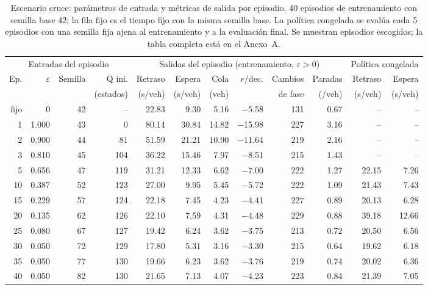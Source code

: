 \begin{table}[H]
\centering
\scriptsize
\setlength{\tabcolsep}{3pt}
\begin{tabular}{rrrrrrrrrrrr}
\toprule
\multicolumn{4}{c}{Entradas del episodio} & \multicolumn{6}{c}{Salidas del episodio (entrenamiento, $\varepsilon>0$)} & \multicolumn{2}{c}{Política congelada} \\
\cmidrule(lr){1-4}\cmidrule(lr){5-10}\cmidrule(lr){11-12}
Ep. & $\varepsilon$ & Semilla & Q ini. & Retraso & Espera & Cola & $r$/dec. & Cambios & Paradas & Retraso & Espera \\
 &  &  & (estados) & (s/veh) & (s/veh) & (veh) &  & de fase & (/veh) & (s/veh) & (s/veh) \\
\midrule
fijo & 0 & 42 & -- & 22.83 & 9.30 & 5.16 & $-$5.58 & 131 & 0.67 & -- & -- \\
\midrule
1 & 1.000 & 43 & 0 & 80.14 & 30.84 & 14.82 & $-$15.98 & 227 & 3.16 & -- & -- \\
2 & 0.900 & 44 & 81 & 51.59 & 21.21 & 10.90 & $-$11.64 & 219 & 2.16 & -- & -- \\
3 & 0.810 & 45 & 104 & 36.22 & 15.46 & 7.97 & $-$8.51 & 215 & 1.43 & -- & -- \\
5 & 0.656 & 47 & 119 & 31.21 & 12.33 & 6.62 & $-$7.00 & 222 & 1.27 & 22.15 & 7.26 \\
10 & 0.387 & 52 & 123 & 27.00 & 9.95 & 5.45 & $-$5.72 & 222 & 1.09 & 21.43 & 7.43 \\
15 & 0.229 & 57 & 124 & 22.18 & 7.45 & 4.23 & $-$4.41 & 227 & 0.89 & 20.13 & 6.28 \\
20 & 0.135 & 62 & 126 & 22.10 & 7.59 & 4.31 & $-$4.48 & 229 & 0.88 & 39.18 & 12.66 \\
25 & 0.080 & 67 & 127 & 19.42 & 6.24 & 3.62 & $-$3.75 & 213 & 0.72 & 20.50 & 6.56 \\
30 & 0.050 & 72 & 129 & 17.80 & 5.31 & 3.16 & $-$3.30 & 215 & 0.64 & 19.62 & 6.18 \\
35 & 0.050 & 77 & 130 & 19.66 & 6.23 & 3.62 & $-$3.76 & 219 & 0.74 & 20.02 & 6.36 \\
40 & 0.050 & 82 & 130 & 21.65 & 7.13 & 4.07 & $-$4.23 & 223 & 0.84 & 21.39 & 7.05 \\
\bottomrule
\end{tabular}
\caption[Escenario cruce: episodios de entrenamiento]{Escenario cruce: parámetros de entrada y métricas de salida por episodio. 40 episodios de entrenamiento con semilla base 42; la fila fijo es el tiempo fijo con la misma semilla base. La política congelada se evalúa cada 5 episodios con una semilla fija ajena al entrenamiento y a la evaluación final. Se muestran episodios escogidos; la tabla completa está en el Anexo~A.}
\label{tab:cruce-episodios-resumen}
\end{table}

